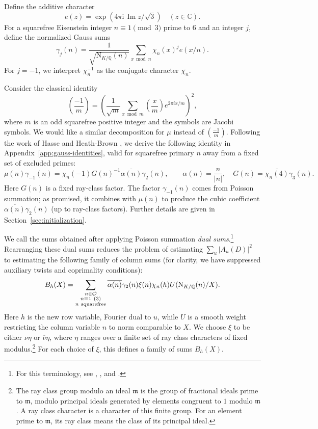 \documentclass[11pt,a4paper]{article}
\numberwithin{equation}{section}
\numberwithin{figure}{section}
\theoremstyle{definition}
\theoremstyle{remark}
\newcommand{\Q}{\mathbb Q}
\newcommand{\NK}{\mathrm N_{K/\Q}}
\newcommand{\OO}{\mathcal O}
\begin{document}
Define the additive character
\[
 e(z)=\exp(4\pi\mathrm i\,\operatorname{Im}z/\sqrt3)\quad(z\in\mathbb C).
\]
For a squarefree Eisenstein integer $n\equiv1\pmod3$ prime to $6$ and an integer $j$, define the normalized Gauss sums
\begin{equation}\label{eq:intro-gauss-sum}
 \gamma_j(n)=\frac{1}{\sqrt{\NK(n)}}
       \sum_{x\bmod n}\chi_n(x)^j e(x/n).
\end{equation}
For $j=-1$, we interpret $\chi_n^{-1}$ as the conjugate character $\overline{\chi_n}$.

Consider the classical identity
\[
 \left(\frac{-1}{m}\right)=\left(\frac{1}{\sqrt{m}}\sum_{x\bmod m}\left(\frac{x}{m}\right)e^{2\pi ix/m}\right)^2,
\]
where $m$ is an odd squarefree positive integer and the symbols are Jacobi symbols. We would like a similar decomposition for $\mu$ instead of $\left(\frac{-1}{m}\right)$. Following the work of Hasse \cite[pp.~443--445]{Has50} and Heath-Brown \cite[(2)]{HB00}, we derive the following identity in Appendix~\ref{app:gauss-identities}, valid for squarefree primary $n$ away from a fixed set of excluded primes:
\[
 \mu(n)\gamma_{-1}(n)=\chi_n(-1)G(n)^{-1}\overline{\alpha(n)}\gamma_2(n),
 \qquad \alpha(n)=\frac{n}{|n|},\quad G(n)=\overline{\chi_n(4)}\gamma_3(n).
\]
Here $G(n)$ is a fixed ray-class factor. The factor $\gamma_{-1}(n)$ comes from Poisson summation; as promised, it combines with $\mu(n)$ to produce the cubic coefficient $\overline{\alpha(n)}\gamma_2(n)$ (up to ray-class factors). Further details are given in Section~\ref{sec:initialization}.

We call the sums obtained after applying Poisson summation \emph{dual sums}.\footnote{For this terminology, see \cite[p.~440]{PY20},
\cite[\S2.3]{KLMS20}, and \cite[arXiv abstract]{FLN10}.} Rearranging these dual sums reduces the problem of estimating
$\sum_u |A_u(D)|^2$ to estimating the following family of column sums (for clarity, we have suppressed auxiliary twists and coprimality conditions):
\begin{equation}\label{eq:intro-gauss-family}
 B_h(X)=\sum_{\substack{n\in\OO\\n\equiv1\ (3)\\n\ {\rm squarefree}}}
       \overline{\alpha(n)}\gamma_2(n)\xi(n)\chi_n(h)
       U(\NK(n)/X).
\end{equation}
Here $h$ is the new row variable, Fourier dual to $u$, while $U$ is a smooth weight restricting the column variable $n$ to norm comparable to $X$. We choose $\xi$ to be either $\nu\eta$ or $\overline{\nu}\eta$, 
where $\eta$ ranges over a finite set of ray class characters of fixed modulus.\footnote{The ray class group modulo an ideal $\mathfrak m$ is the group of fractional ideals prime to $\mathfrak m$, modulo principal ideals generated by elements congruent to $1$ modulo $\mathfrak m$. A ray class character is a character of this finite group. For an element prime to $\mathfrak m$, its ray class means the class of its principal ideal.}  For each choice of $\xi$, this defines a family of sums $B_h(X)$.
\end{document}
